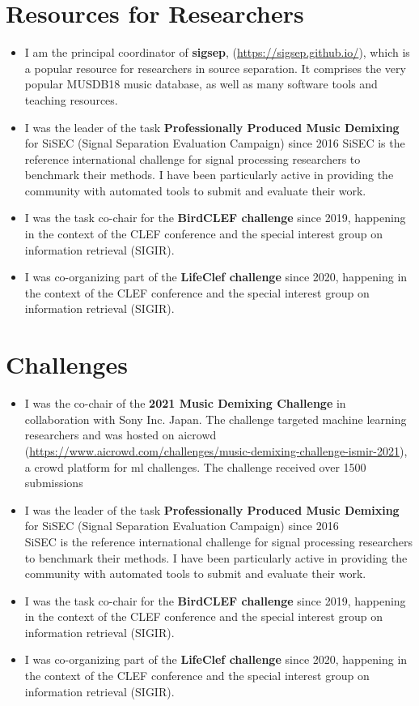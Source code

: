 \documentclass[a4paper,11pt]{article}
\newcommand{\resumeSubHeadingListStart}{\begin{itemize}[leftmargin=*]}
\newcommand{\resumeSubHeadingListEnd}{\end{itemize}}
\begin{document}
\section{Resources for Researchers}
\resumeSubHeadingListStart
  \item{I am the principal coordinator of \textbf{sigsep}, (\url{https://sigsep.github.io/}), which is a popular resource for researchers in source separation.}
  It comprises the very popular \textsc{MUSDB18} music database, as well as many software tools and teaching resources.
  \item{I was the leader of the task \textbf{Professionally Produced Music Demixing} for SiSEC (Signal Separation Evaluation Campaign) since 2016}
  SiSEC is the reference international challenge for signal processing researchers to benchmark their methods. I have been particularly active in providing the community with automated tools to submit and evaluate their work.
  \item{I was the task co-chair for the \textbf{BirdCLEF challenge} since 2019, happening in the context of the CLEF conference and the special interest group on information retrieval (SIGIR).}
  \item{I was co-organizing part of the \textbf{LifeClef challenge} since 2020, happening in the context of the CLEF conference and the special interest group on information retrieval (SIGIR).}
\resumeSubHeadingListEnd

\section{Challenges}
  \resumeSubHeadingListStart
    \item{I was the co-chair of the \textbf{2021 Music Demixing Challenge} in collaboration with Sony Inc. Japan. The challenge targeted machine learning researchers and was hosted on aicrowd (\url{https://www.aicrowd.com/challenges/music-demixing-challenge-ismir-2021}), a crowd platform for ml challenges. The challenge received over 1500 submissions}
    \item{I was the leader of the task \textbf{Professionally Produced Music Demixing} for SiSEC (Signal Separation Evaluation Campaign) since 2016\\
    SiSEC is the reference international challenge for signal processing researchers to benchmark their methods. I have been particularly active in providing the community with automated tools to submit and evaluate their work.}
    \item{I was the task co-chair for the \textbf{BirdCLEF challenge} since 2019, happening in the context of the CLEF conference and the special interest group on information retrieval (SIGIR).}
    \item{I was co-organizing part of the \textbf{LifeClef challenge} since 2020, happening in the context of the CLEF conference and the special interest group on information retrieval (SIGIR).}
  \resumeSubHeadingListEnd
\end{document}
